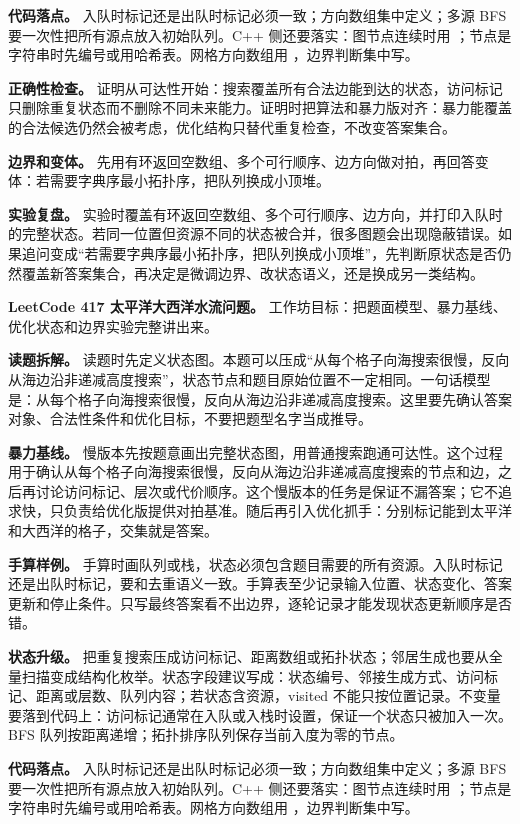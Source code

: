 \textbf{代码落点。} 入队时标记还是出队时标记必须一致；方向数组集中定义；多源 BFS 要一次性把所有源点放入初始队列。C++ 侧还要落实：图节点连续时用 ；节点是字符串时先编号或用哈希表。网格方向数组用 ，边界判断集中写。

\textbf{正确性检查。} 证明从可达性开始：搜索覆盖所有合法边能到达的状态，访问标记只删除重复状态而不删除不同未来能力。证明时把算法和暴力版对齐：暴力能覆盖的合法候选仍然会被考虑，优化结构只替代重复检查，不改变答案集合。

\textbf{边界和变体。} 先用有环返回空数组、多个可行顺序、边方向做对拍，再回答变体：若需要字典序最小拓扑序，把队列换成小顶堆。

\textbf{实验复盘。} 实验时覆盖有环返回空数组、多个可行顺序、边方向，并打印入队时的完整状态。若同一位置但资源不同的状态被合并，很多图题会出现隐蔽错误。如果追问变成“若需要字典序最小拓扑序，把队列换成小顶堆”，先判断原状态是否仍然覆盖新答案集合，再决定是微调边界、改状态语义，还是换成另一类结构。

\noindent\textbf{LeetCode 417 太平洋大西洋水流问题。} 工作坊目标：把题面模型、暴力基线、优化状态和边界实验完整讲出来。

\textbf{读题拆解。} 读题时先定义状态图。本题可以压成“从每个格子向海搜索很慢，反向从海边沿非递减高度搜索”，状态节点和题目原始位置不一定相同。一句话模型是：从每个格子向海搜索很慢，反向从海边沿非递减高度搜索。这里要先确认答案对象、合法性条件和优化目标，不要把题型名字当成推导。

\textbf{暴力基线。} 慢版本先按题意画出完整状态图，用普通搜索跑通可达性。这个过程用于确认从每个格子向海搜索很慢，反向从海边沿非递减高度搜索的节点和边，之后再讨论访问标记、层次或代价顺序。这个慢版本的任务是保证不漏答案；它不追求快，只负责给优化版提供对拍基准。随后再引入优化抓手：分别标记能到太平洋和大西洋的格子，交集就是答案。

\textbf{手算样例。} 手算时画队列或栈，状态必须包含题目需要的所有资源。入队时标记还是出队时标记，要和去重语义一致。手算表至少记录输入位置、状态变化、答案更新和停止条件。只写最终答案看不出边界，逐轮记录才能发现状态更新顺序是否错。

\textbf{状态升级。} 把重复搜索压成访问标记、距离数组或拓扑状态；邻居生成也要从全量扫描变成结构化枚举。状态字段建议写成：状态编号、邻接生成方式、访问标记、距离或层数、队列内容；若状态含资源，visited 不能只按位置记录。不变量要落到代码上：访问标记通常在入队或入栈时设置，保证一个状态只被加入一次。BFS 队列按距离递增；拓扑排序队列保存当前入度为零的节点。

\textbf{代码落点。} 入队时标记还是出队时标记必须一致；方向数组集中定义；多源 BFS 要一次性把所有源点放入初始队列。C++ 侧还要落实：图节点连续时用 ；节点是字符串时先编号或用哈希表。网格方向数组用 ，边界判断集中写。

